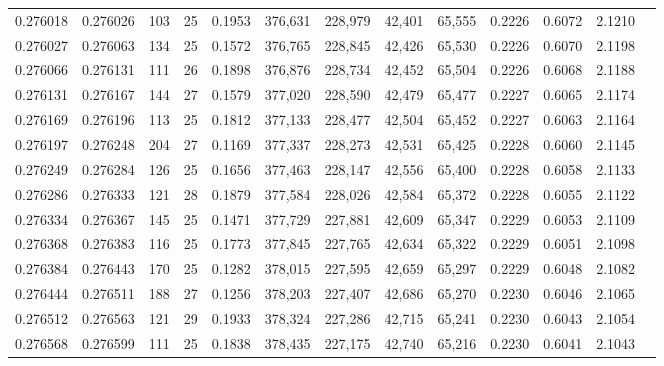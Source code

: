 \begin{tabular}{rrrrrrrrrrrrr}
0.276018 & 0.276026 &   103 &  25 &                                     0.1953 & 376,631 & 228,979 &  42,401 &  65,555 & 0.2226 & 0.6072 & 2.1210 \\
0.276027 & 0.276063 &   134 &  25 &                                     0.1572 & 376,765 & 228,845 &  42,426 &  65,530 & 0.2226 & 0.6070 & 2.1198 \\
0.276066 & 0.276131 &   111 &  26 &                                     0.1898 & 376,876 & 228,734 &  42,452 &  65,504 & 0.2226 & 0.6068 & 2.1188 \\
0.276131 & 0.276167 &   144 &  27 &                                     0.1579 & 377,020 & 228,590 &  42,479 &  65,477 & 0.2227 & 0.6065 & 2.1174 \\
0.276169 & 0.276196 &   113 &  25 &                                     0.1812 & 377,133 & 228,477 &  42,504 &  65,452 & 0.2227 & 0.6063 & 2.1164 \\
0.276197 & 0.276248 &   204 &  27 &                                     0.1169 & 377,337 & 228,273 &  42,531 &  65,425 & 0.2228 & 0.6060 & 2.1145 \\
0.276249 & 0.276284 &   126 &  25 &                                     0.1656 & 377,463 & 228,147 &  42,556 &  65,400 & 0.2228 & 0.6058 & 2.1133 \\
0.276286 & 0.276333 &   121 &  28 &                                     0.1879 & 377,584 & 228,026 &  42,584 &  65,372 & 0.2228 & 0.6055 & 2.1122 \\
0.276334 & 0.276367 &   145 &  25 &                                     0.1471 & 377,729 & 227,881 &  42,609 &  65,347 & 0.2229 & 0.6053 & 2.1109 \\
0.276368 & 0.276383 &   116 &  25 &                                     0.1773 & 377,845 & 227,765 &  42,634 &  65,322 & 0.2229 & 0.6051 & 2.1098 \\
0.276384 & 0.276443 &   170 &  25 &                                     0.1282 & 378,015 & 227,595 &  42,659 &  65,297 & 0.2229 & 0.6048 & 2.1082 \\
0.276444 & 0.276511 &   188 &  27 &                                     0.1256 & 378,203 & 227,407 &  42,686 &  65,270 & 0.2230 & 0.6046 & 2.1065 \\
0.276512 & 0.276563 &   121 &  29 &                                     0.1933 & 378,324 & 227,286 &  42,715 &  65,241 & 0.2230 & 0.6043 & 2.1054 \\
0.276568 & 0.276599 &   111 &  25 &                                     0.1838 & 378,435 & 227,175 &  42,740 &  65,216 & 0.2230 & 0.6041 & 2.1043 \\

\end{tabular}
